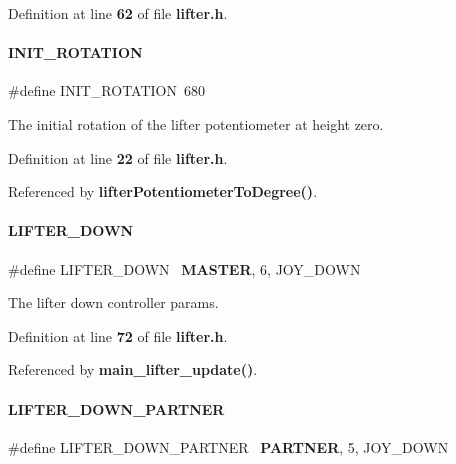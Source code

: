 Definition at line \textbf{ 62} of file \textbf{ lifter.\+h}.

\mbox{\label{lifter_8h_a0685a3cee7d5cabe98d2c9c97bed5727}} 
\paragraph{I\+N\+I\+T\+\_\+\+R\+O\+T\+A\+T\+I\+ON}
{\footnotesize\ttfamily \#define I\+N\+I\+T\+\_\+\+R\+O\+T\+A\+T\+I\+ON~680}



The initial rotation of the lifter potentiometer at height zero. 



Definition at line \textbf{ 22} of file \textbf{ lifter.\+h}.



Referenced by \textbf{ lifter\+Potentiometer\+To\+Degree()}.

\mbox{\label{lifter_8h_a12f8c1de242a92f5694e6b80b990773a}} 
\paragraph{L\+I\+F\+T\+E\+R\+\_\+\+D\+O\+WN}
{\footnotesize\ttfamily \#define L\+I\+F\+T\+E\+R\+\_\+\+D\+O\+WN~\textbf{ M\+A\+S\+T\+ER}, 6, J\+O\+Y\+\_\+\+D\+O\+WN}



The lifter down controller params. 



Definition at line \textbf{ 72} of file \textbf{ lifter.\+h}.



Referenced by \textbf{ main\+\_\+lifter\+\_\+update()}.

\mbox{\label{lifter_8h_a40a0b4dc0172c4133a34d5e3d8b69f9a}} 
\paragraph{L\+I\+F\+T\+E\+R\+\_\+\+D\+O\+W\+N\+\_\+\+P\+A\+R\+T\+N\+ER}
{\footnotesize\ttfamily \#define L\+I\+F\+T\+E\+R\+\_\+\+D\+O\+W\+N\+\_\+\+P\+A\+R\+T\+N\+ER~\textbf{ P\+A\+R\+T\+N\+ER}, 5, J\+O\+Y\+\_\+\+D\+O\+WN}



